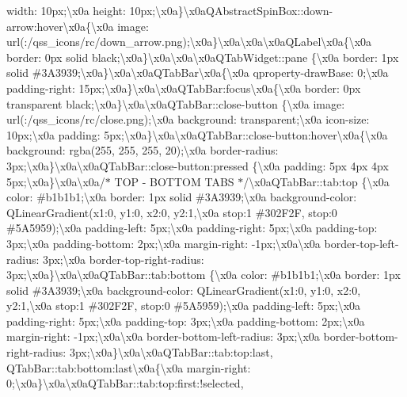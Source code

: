 width\+: 10px;\textbackslash{}x0a height\+: 10px;\textbackslash{}x0a\}\textbackslash{}x0a\+Q\+Abstract\+Spin\+Box\+::down-\/arrow\+:hover\textbackslash{}x0a\{\textbackslash{}x0a image\+: url(\+:/qss\+\_\+icons/rc/down\+\_\+arrow.\+png);\textbackslash{}x0a\}\textbackslash{}x0a\textbackslash{}x0a\textbackslash{}x0a\+Q\+Label\textbackslash{}x0a\{\textbackslash{}x0a border\+: 0px solid black;\textbackslash{}x0a\}\textbackslash{}x0a\textbackslash{}x0a\textbackslash{}x0a\+Q\+Tab\+Widget\+::pane \{\textbackslash{}x0a border\+: 1px solid \#3\+A3939;\textbackslash{}x0a\}\textbackslash{}x0a\textbackslash{}x0a\+Q\+Tab\+Bar\textbackslash{}x0a\{\textbackslash{}x0a qproperty-\/draw\+Base\+: 0;\textbackslash{}x0a padding-\/right\+: 15px;\textbackslash{}x0a\}\textbackslash{}x0a\textbackslash{}x0a\+Q\+Tab\+Bar\+:focus\textbackslash{}x0a\{\textbackslash{}x0a border\+: 0px transparent black;\textbackslash{}x0a\}\textbackslash{}x0a\textbackslash{}x0a\+Q\+Tab\+Bar\+::close-\/button \{\textbackslash{}x0a image\+: url(\+:/qss\+\_\+icons/rc/close.\+png);\textbackslash{}x0a background\+: transparent;\textbackslash{}x0a icon-\/size\+: 10px;\textbackslash{}x0a padding\+: 5px;\textbackslash{}x0a\}\textbackslash{}x0a\textbackslash{}x0a\+Q\+Tab\+Bar\+::close-\/button\+:hover\textbackslash{}x0a\{\textbackslash{}x0a background\+: rgba(255, 255, 255, 20);\textbackslash{}x0a border-\/radius\+: 3px;\textbackslash{}x0a\}\textbackslash{}x0a\textbackslash{}x0a\+Q\+Tab\+Bar\+::close-\/button\+:pressed \{\textbackslash{}x0a padding\+: 5px 4px 4px 5px;\textbackslash{}x0a\}\textbackslash{}x0a\textbackslash{}x0a/$\ast$ T\+O\+P -\/ B\+O\+T\+T\+O\+M T\+A\+B\+S $\ast$/\textbackslash{}x0a\+Q\+Tab\+Bar\+::tab\+:top \{\textbackslash{}x0a color\+: \#b1b1b1;\textbackslash{}x0a border\+: 1px solid \#3\+A3939;\textbackslash{}x0a background-\/color\+: Q\+Linear\+Gradient(x1\+:0, y1\+:0, x2\+:0, y2\+:1,\textbackslash{}x0a stop\+:1 \#302\+F2\+F, stop\+:0 \#5\+A5959);\textbackslash{}x0a padding-\/left\+: 5px;\textbackslash{}x0a padding-\/right\+: 5px;\textbackslash{}x0a padding-\/top\+: 3px;\textbackslash{}x0a padding-\/bottom\+: 2px;\textbackslash{}x0a margin-\/right\+: -\/1px;\textbackslash{}x0a\textbackslash{}x0a border-\/top-\/left-\/radius\+: 3px;\textbackslash{}x0a border-\/top-\/right-\/radius\+: 3px;\textbackslash{}x0a\}\textbackslash{}x0a\textbackslash{}x0a\+Q\+Tab\+Bar\+::tab\+:bottom \{\textbackslash{}x0a color\+: \#b1b1b1;\textbackslash{}x0a border\+: 1px solid \#3\+A3939;\textbackslash{}x0a background-\/color\+: Q\+Linear\+Gradient(x1\+:0, y1\+:0, x2\+:0, y2\+:1,\textbackslash{}x0a stop\+:1 \#302\+F2\+F, stop\+:0 \#5\+A5959);\textbackslash{}x0a padding-\/left\+: 5px;\textbackslash{}x0a padding-\/right\+: 5px;\textbackslash{}x0a padding-\/top\+: 3px;\textbackslash{}x0a padding-\/bottom\+: 2px;\textbackslash{}x0a margin-\/right\+: -\/1px;\textbackslash{}x0a\textbackslash{}x0a border-\/bottom-\/left-\/radius\+: 3px;\textbackslash{}x0a border-\/bottom-\/right-\/radius\+: 3px;\textbackslash{}x0a\}\textbackslash{}x0a\textbackslash{}x0a\+Q\+Tab\+Bar\+::tab\+:top\+:last, Q\+Tab\+Bar\+::tab\+:bottom\+:last\textbackslash{}x0a\{\textbackslash{}x0a margin-\/right\+: 0;\textbackslash{}x0a\}\textbackslash{}x0a\textbackslash{}x0a\+Q\+Tab\+Bar\+::tab\+:top\+:first\+:!selected, 